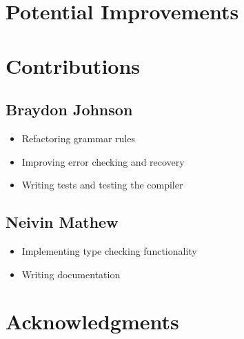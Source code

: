 \documentclass[12pt, letterpaper]{article}
\begin{document}
\section{Potential Improvements}

\section{Contributions}
\subsection{Braydon Johnson}
\begin{itemize}
\setlength\itemsep{0em}
\item Refactoring grammar rules
\item Improving error checking and recovery
\item Writing tests and testing the compiler
\end{itemize}
\subsection{Neivin Mathew}
\begin{itemize}
\setlength\itemsep{0em}
\item Implementing type checking functionality
\item Writing documentation
\end{itemize}

\section{Acknowledgments}
\end{document}
